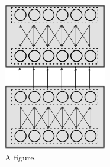 \begin{figure}
	\centering
    	\includegraphics[width=0.4\textwidth]{imgs/spike_dbn.png} 
    \caption{A figure.}
	\label{fig:test}
\end{figure}

